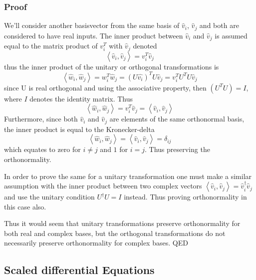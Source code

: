 \documentclass[aip,nobalancelastpage,
twocolumn,
rsi,%
 amsmath,amssymb,
 reprint,%
]{revtex4}
\begin{document}
\subsubsection{Proof}
We'll consider another basisvector from the same basis of $\hat{v}_i$, $\hat{v}_j$ and both are considered to have real inputs. The inner product between $\hat{v}_i$ and $\hat{v}_j$ is assumed equal to the matrix product of $v_i^T$ with $\hat{v}_j$ denoted 
\begin{equation}
\left<\hat{v}_i, \hat{v}_j \right> = v_i^T\hat{v}_j
\end{equation}
thus the inner product of the unitary or orthogonal transformations is 
\begin{equation}
\left<\hat{w}_i,\hat{w}_j\right> = w_i^T\hat{w}_j=\left(U\hat{v_i}\right)^TU\hat{v}_j = v_i^TU^TU\hat{v}_j
\end{equation}
since U is real orthogonal and using the associative property, then $(U^T U) = I$, where $I$ denotes the identity matrix. Thus
\begin{equation}
\left<\hat{w}_i,\hat{w}_j\right> = v_i^T \hat{v}_j=\left<\hat{v}_i,\hat{v}_j\right>
\end{equation}
Furthermore, since both $\hat{v}_i$ and $\hat{v}_j$ are elements of the same orthonormal basis, the inner product is equal to the Kronecker-delta
\begin{equation}
\left<\hat{w}_i,\hat{w}_j\right> =\left<\hat{v}_i,\hat{v}_j\right> = \delta_{ij}
\end{equation}
which equates to zero for $i\neq j$ and $1$ for $i=j$. Thus preserving the orthonormality.\par
In order to prove the same for a unitary transformation one must make a similar assumption with the inner
product between two complex vectors $\left<\hat{v}_i, \hat{v}_j\right> = \hat{v}_i^\dagger \hat{v}_j$ and use the unitary condition $U^\dagger U = I$ instead. Thus proving orthonormality in this case also.\par
Thus it would seem that unitary transformations preserve orthonormality for both real and complex bases, but the orthogonal transformations do not necessarily preserve orthonormality for complex bases.
QED

\subsection{Scaled differential Equations}
\end{document}
